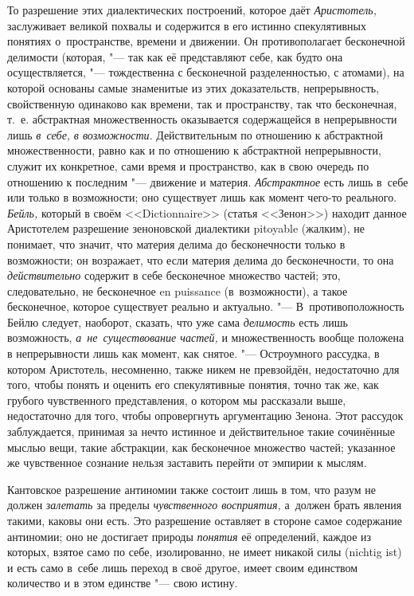 То разрешение этих диалектических построений, которое даёт {\em Аристотель,}
заслуживает великой похвалы и содержится в его истинно спекулятивных понятиях
о~пространстве, времени и движении. Он противополагает бесконечной делимости
(которая, "--- так как её представляют себе, как будто она осуществляется, "---
тождественна с бесконечной разделенностью, с атомами), на которой основаны
самые знаменитые из этих доказательств, непрерывность, свойственную одинаково
как времени, так и пространству, так что бесконечная, т.~е. абстрактная
множественность оказывается содержащейся в непрерывности лишь {\em в~себе,}
{\em в возможности}. Действительным по отношению к абстрактной множественности,
равно как и по отношению к абстрактной непрерывности, служит их конкретное,
сами время и пространство, как в свою очередь по отношению к последним "---
движение и материя. {\em Абстрактное} есть лишь в~себе или только в
возможности; оно существует лишь как момент чего-то реального. {\em Бейль,}
который в своём <<Dic\-tion\-naire>> (статья <<Зенон>>) находит данное
Аристотелем разрешение зеноновской диалектики pitoyable (жалким), не понимает,
что значит, что материя делима до бесконечности только в возможности; он
возражает, что если материя делима до бесконечности, то она {\em действительно}
содержит в себе бесконечное множество частей; это, следовательно, не
бесконечное en puissance (в~возможности), а такое бесконечное, которое
существует реально и актуально. "--- В~противоположность Бейлю следует,
наоборот, сказать, что уже сама {\em делимость} есть лишь возможность,
{\em а~не~существование частей,} и множественность вообще положена в
непрерывности лишь как момент, как снятое. "--- Остроумного рассудка, в котором
Аристотель, несомненно, также никем не превзойдён, недостаточно для того, чтобы
понять и оценить его спекулятивные понятия, точно так же, как грубого
чувственного представления, о котором мы рассказали выше, недостаточно для
того, чтобы опровергнуть аргументацию Зенона. Этот рассудок заблуждается,
принимая за нечто истинное и действительное такие сочинённые мыслью вещи, такие
абстракции, как бесконечное множество частей; указанное же чувственное сознание
нельзя заставить перейти от эмпирии к мыслям.

Кантовское разрешение антиномии также состоит лишь в том, что разум не должен
{\em залетать} за пределы {\em чувственного восприятия,} а~должен брать явления
такими, каковы они есть. Это разрешение оставляет в стороне самое содержание
антиномии; оно не достигает природы {\em понятия} её определений, каждое из
которых, взятое само по себе, изолированно, не имеет никакой силы (nich\-tig
ist) и есть само в~себе лишь переход в своё другое, имеет своим единством
количество и в этом единстве "--- свою истину.\label{bkm:bm88b}


